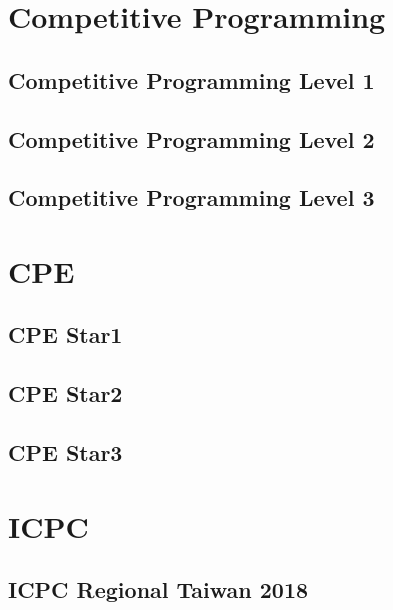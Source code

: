 \documentclass[a4paper]{report}
\begin{document}
\maketitle
\tableofcontents
\chapter{Competitive Programming}
\section{Competitive Programming Level 1}



\section{Competitive Programming Level 2}






\section{Competitive Programming Level 3}


\chapter{CPE}
\section{CPE Star1}




\section{CPE Star2}

\section{CPE Star3}

\chapter{ICPC}
\section{ICPC Regional Taiwan 2018}


\end{document}
